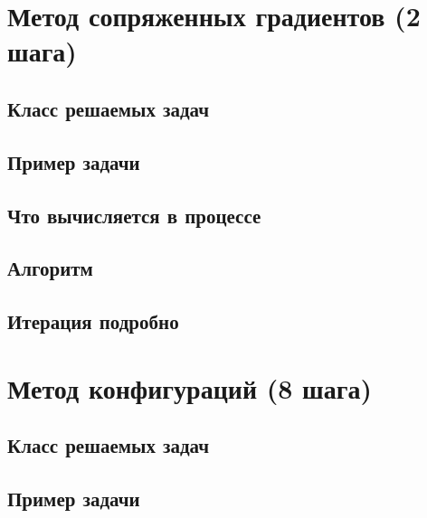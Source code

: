 %


\section{Метод сопряженных градиентов (2 шага)}

\subsection{Класс решаемых задач} %

\subsection{Пример задачи} %

\subsection{Что вычисляется в процессе}

\subsection{Алгоритм} %

\subsection{Итерация подробно} %

\section{Метод конфигураций (8 шага)}

\subsection{Класс решаемых задач} %

\subsection{Пример задачи} %

